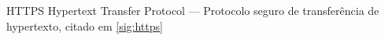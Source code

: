 \begin{siglas}
\item[HTTPS]\hypertarget{s:http}{Hypertext Transfer Protocol} --- Protocolo seguro de
  transferência de hypertexto, citado em \ref{sig:https}
\end{siglas}
